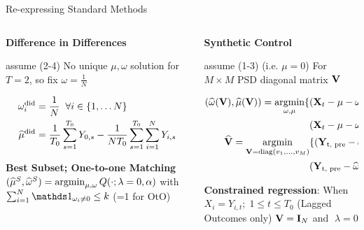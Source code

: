 \documentclass[12pt, aspectratio=169]{beamer}
\begin{document}
\begin{frame}{Re-expressing Standard Methods}

\begin{columns}
  \begin{column}{0.5\textwidth}
  \footnotesize
  \textbf{Difference in Differences}

  \bi
  \I assume (2-4)
  \I No unique $\mu, \omega$ solution for $T = 2$, so fix $\omega = \frac{1}{N}$
  \ei

  \begin{align*}
  \omega_i^{\text{did}} & = \frac{1}{N} \; \; \forall i \in \left\{ 1, \dots N \right\}  \\
  \widehat{\mu}^{\text{did}} & =  \frac{1}{T_0} \sum_{s=1}^{T_0} Y_{0, s} -
  \frac{1}{NT_0} \sum_{s=1}^{T_0} \sum_{i=1}^N Y_{i, s} \\
  \end{align*}

\textbf{Best Subset; One-to-one Matching}
$
(\widehat{\mu}^S, \widehat{\omega}^S) = \mathop{\rm argmin}_{\mu, \omega} Q(\cdot ; \lambda
= 0, \alpha) $ with $\sum_{i=1}^N \Indic{\omega_i \neq 0} \leq k$ (=1
for OtO)

\end{column}

\begin{column}{0.5\textwidth}
\footnotesize
\textbf{Synthetic Control}

\bi
  \I assume (1-3) (i.e. $\mu = 0$)
  \I For $M \times M$ PSD diagonal matrix $\mathbf{V}$
\ei

\begin{align*}
(\widehat{\omega}(\mathbf{V}), \widehat{\mu}(\mathbf{V})) = \mathop{\rm argmin}_{\omega, \mu}
  \{ & (\mathbf{X}_t - \mu - \omega ^{\top} \mathbf{X})^{\top} \mathbf{V} \\
          &  (\mathbf{X}_t - \mu - \omega ^{\top} \mathbf{X}) \} \\
\widehat{\mathbf{V}} = \mathop{\rm argmin}_{\mathbf{V} = \mathop{\rm diag} (v_1, \dots, v_M)} &
  \{
    (\mathbf{Y}_{\text{t, pre}} - \widehat{\omega}(\mathbf{V}) ^{\top} \mathbf{Y}_{\text{c, pre}})
   ^{\top} \\
    & (\mathbf{Y}_{\text{t, pre}} - \widehat{\omega}(\mathbf{V}) ^{\top} \mathbf{Y}_{\text{c, pre}})
   \}
\end{align*}

\textbf{Constrained regression}:
When $X_i = Y_{i,t}; \; 1 \leq t \leq T_0$ (Lagged Outcomes only)
$\mathbf{V} = \mathbf{I}_N$ and $ \; \lambda = 0$

\end{column}
\end{columns}
\end{frame}



\begin{frame}
\printbibliography
\end{frame}
\end{document}
